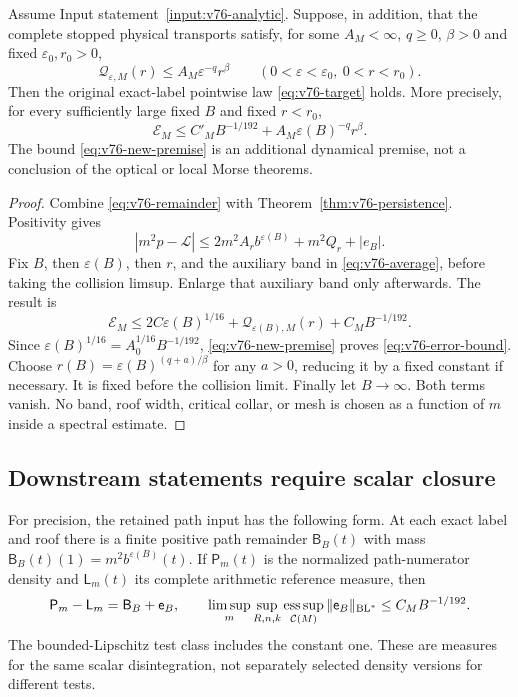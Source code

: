 \begin{theorem}
\label{thm:v76-closure}
Assume Input statement~\ref{input:v76-analytic}. Suppose, in addition,
that the complete stopped physical transports satisfy, for some
$A_M<\infty$, $q\ge0$, $\beta>0$ and fixed $\varepsilon_0,r_0>0$,
\begin{equation}\label{eq:v76-new-premise}
 \mathcal Q_{\varepsilon,M}(r)\le A_M\varepsilon^{-q}r^\beta
 \qquad(0<\varepsilon<\varepsilon_0,\ 0<r<r_0).
\end{equation}
Then the original exact-label pointwise law \eqref{eq:v76-target}
holds. More precisely, for every sufficiently large fixed $B$ and
fixed $r<r_0$,
\begin{equation}\label{eq:v76-error-bound}
 \mathcal E_M\le C'_MB^{-1/192}
                         +A_M\varepsilon(B)^{-q}r^\beta.
\end{equation}
The bound \eqref{eq:v76-new-premise} is an additional dynamical
premise, not a conclusion of the optical or local Morse theorems.
\end{theorem}
\begin{proof}
Combine \eqref{eq:v76-remainder} with
Theorem~\ref{thm:v76-persistence}. Positivity gives
\[
 |m^2p-\mathcal L|\le 2m^2A_r b^{\varepsilon(B)}
                         +m^2Q_r+|e_B|.
\]
Fix $B$, then $\varepsilon(B)$, then $r$, and the auxiliary band
in \eqref{eq:v76-average}, before taking the collision limsup.
Enlarge that auxiliary band only afterwards. The result is
\[
 \mathcal E_M\le 2C\varepsilon(B)^{1/16}
                 +\mathcal Q_{\varepsilon(B),M}(r)+C_MB^{-1/192}.
\]
Since $\varepsilon(B)^{1/16}=A_0^{1/16}B^{-1/192}$,
\eqref{eq:v76-new-premise} proves \eqref{eq:v76-error-bound}.
Choose $r(B)=\varepsilon(B)^{(q+a)/\beta}$ for any $a>0$,
reducing it by a fixed constant if necessary. It is fixed before
the collision limit. Finally let $B\to\infty$. Both terms vanish.
No band, roof width, critical collar, or mesh is chosen as a
function of $m$ inside a spectral estimate.
\end{proof}

\subsection{Downstream statements require scalar closure}
For precision, the retained path input has the following form.
At each exact label and roof there is a finite positive path
remainder $\mathsf B_B(t)$ with mass
$\mathsf B_B(t)(1)=m^2b^{\varepsilon(B)}(t)$. If $\mathsf P_m(t)$
is the normalized path-numerator density and $\mathsf L_m(t)$
its complete arithmetic reference measure, then
\[
 \mathsf P_m-\mathsf L_m=\mathsf B_B+\mathsf e_B,
 \qquad\limsup_m\sup_{R,n,k}\operatorname*{ess\,sup}_{\mathcal C(M)}
          \|\mathsf e_B\|_{\mathrm{BL}^*}\le C_MB^{-1/192}.
\]
The bounded-Lipschitz test class includes the constant one. These
are measures for the same scalar disintegration, not separately
selected density versions for different tests.

